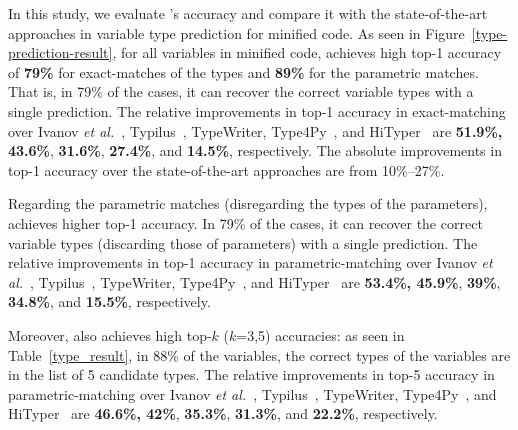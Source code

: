 
In this study, we evaluate {\tool}'s accuracy and compare it with the
state-of-the-art approaches in variable type prediction for minified
code. As seen in Figure~\ref{type-prediction-result}, for all
variables in minified code, {\tool} achieves high top-1 accuracy of
{\bf 79\%} for exact-matches of the types and {\bf 89\%} for the
parametric matches. That is, in 79\% of the cases, it can recover the
correct variable types with a single prediction.
%
The relative improvements in top-1 accuracy in exact-matching over
Ivanov {\em et al.}~\cite{ivanov21predicting},
Typilus~\cite{typilus-pldi20}, TypeWriter\cite{typewriter-fse20},
Type4Py~\cite{Type4Py-icse22}, and HiTyper~\cite{HiTyper-icse22} are
{\bf 51.9\%, 43.6\%}, {\bf 31.6\%}, {\bf 27.4\%}, and {\bf
  14.5\%}, respectively. The absolute improvements in top-1 accuracy
over the state-of-the-art approaches are from
10\%--27\%.

Regarding the parametric matches (disregarding the types of the
parameters), {\tool} achieves higher top-1 accuracy. In 79\% of the
cases, it can recover the correct variable types (discarding those of
parameters) with a single prediction. The relative improvements in
top-1 accuracy in parametric-matching over Ivanov {\em et
  al.}~\cite{ivanov21predicting}, Typilus~\cite{typilus-pldi20},
TypeWriter\cite{typewriter-fse20}, Type4Py~\cite{Type4Py-icse22}, and
HiTyper~\cite{HiTyper-icse22} are {\bf 53.4\%, 45.9\%}, {\bf 39\%},
{\bf 34.8\%}, and {\bf 15.5\%}, respectively.

Moreover, {\tool} also achieves high top-$k$ ($k$=3,5) accuracies: as
seen in Table~\ref{type_result}, in 88\% of the variables, the correct
types of the variables are in the list of 5 candidate types. The
relative improvements in top-5 accuracy in parametric-matching over
Ivanov {\em et al.}~\cite{ivanov21predicting},
Typilus~\cite{typilus-pldi20}, TypeWriter\cite{typewriter-fse20},
Type4Py~\cite{Type4Py-icse22}, and HiTyper~\cite{HiTyper-icse22} are
{\bf 46.6\%, 42\%}, {\bf 35.3\%}, {\bf 31.3\%}, and {\bf 22.2\%},
respectively.


